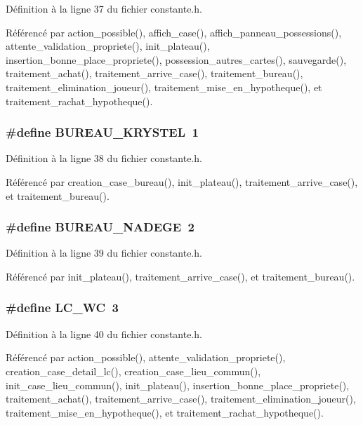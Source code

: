 D\'{e}finition \`{a} la ligne 37 du fichier constante.h.

R\'{e}f\'{e}renc\'{e} par action\_\-possible(), affich\_\-case(), affich\_\-panneau\_\-possessions(), attente\_\-validation\_\-propriete(), init\_\-plateau(), insertion\_\-bonne\_\-place\_\-propriete(), possession\_\-autres\_\-cartes(), sauvegarde(), traitement\_\-achat(), traitement\_\-arrive\_\-case(), traitement\_\-bureau(), traitement\_\-elimination\_\-joueur(), traitement\_\-mise\_\-en\_\-hypotheque(), et traitement\_\-rachat\_\-hypotheque().
\subsubsection{\setlength{\rightskip}{0pt plus 5cm}\#define BUREAU\_\-KRYSTEL~1}\label{constante_8h_c8a17d7f3309f612556a9ad89c065155}




D\'{e}finition \`{a} la ligne 38 du fichier constante.h.

R\'{e}f\'{e}renc\'{e} par creation\_\-case\_\-bureau(), init\_\-plateau(), traitement\_\-arrive\_\-case(), et traitement\_\-bureau().
\subsubsection{\setlength{\rightskip}{0pt plus 5cm}\#define BUREAU\_\-NADEGE~2}\label{constante_8h_08de010d0cea646b8bbb7ded84bec89b}




D\'{e}finition \`{a} la ligne 39 du fichier constante.h.

R\'{e}f\'{e}renc\'{e} par init\_\-plateau(), traitement\_\-arrive\_\-case(), et traitement\_\-bureau().
\subsubsection{\setlength{\rightskip}{0pt plus 5cm}\#define LC\_\-WC~3}\label{constante_8h_d6374d072f3b90625b387149b6059452}




D\'{e}finition \`{a} la ligne 40 du fichier constante.h.

R\'{e}f\'{e}renc\'{e} par action\_\-possible(), attente\_\-validation\_\-propriete(), creation\_\-case\_\-detail\_\-lc(), creation\_\-case\_\-lieu\_\-commun(), init\_\-case\_\-lieu\_\-commun(), init\_\-plateau(), insertion\_\-bonne\_\-place\_\-propriete(), traitement\_\-achat(), traitement\_\-arrive\_\-case(), traitement\_\-elimination\_\-joueur(), traitement\_\-mise\_\-en\_\-hypotheque(), et traitement\_\-rachat\_\-hypotheque().
